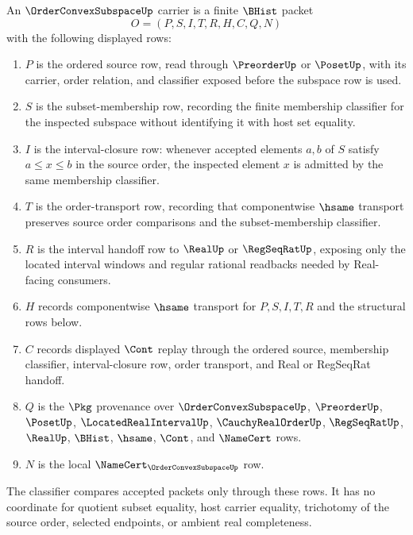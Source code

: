 \begin{definition}
\label{def:order-convex-subspace-carrier}
An $\OrderConvexSubspaceUp$ carrier is a finite $\BHist$ packet
$$
O=(P,S,I,T,R,H,C,Q,N)
$$
with the following displayed rows:
\begin{enumerate}
\item $P$ is the ordered source row, read through $\PreorderUp$ or $\PosetUp$, with its carrier, order relation, and classifier exposed before the subspace row is used.
\item $S$ is the subset-membership row, recording the finite membership classifier for the inspected subspace without identifying it with host set equality.
\item $I$ is the interval-closure row: whenever accepted elements $a,b$ of $S$ satisfy $a\le x\le b$ in the source order, the inspected element $x$ is admitted by the same membership classifier.
\item $T$ is the order-transport row, recording that componentwise $\hsame$ transport preserves source order comparisons and the subset-membership classifier.
\item $R$ is the interval handoff row to $\RealUp$ or $\RegSeqRatUp$, exposing only the located interval windows and regular rational readbacks needed by Real-facing consumers.
\item $H$ records componentwise $\hsame$ transport for $P,S,I,T,R$ and the structural rows below.
\item $C$ records displayed $\Cont$ replay through the ordered source, membership classifier, interval-closure row, order transport, and Real or RegSeqRat handoff.
\item $Q$ is the $\Pkg$ provenance over $\OrderConvexSubspaceUp$, $\PreorderUp$, $\PosetUp$, $\LocatedRealIntervalUp$, $\CauchyRealOrderUp$, $\RegSeqRatUp$, $\RealUp$, $\BHist$, $\hsame$, $\Cont$, and $\NameCert$ rows.
\item $N$ is the local $\NameCert_{\OrderConvexSubspaceUp}$ row.
\end{enumerate}
The classifier compares accepted packets only through these rows. It has no coordinate for quotient subset equality, host carrier equality, trichotomy of the source order, selected endpoints, or ambient real completeness.
\end{definition}

